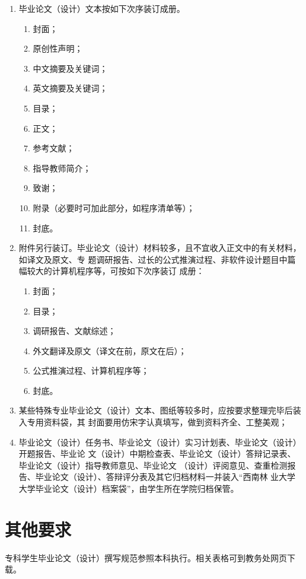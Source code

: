 \begin{enumerate}
\item 毕业论文（设计）文本按如下次序装订成册。
  \begin{enumerate}
  \item 封面；
  \item 原创性声明；
  \item 中文摘要及关键词；
  \item 英文摘要及关键词；
  \item 目录；
  \item 正文；
  \item 参考文献；
  \item 指导教师简介；
  \item 致谢；
  \item 附录（必要时可加此部分，如程序清单等）；
  \item 封底。
  \end{enumerate}
\item 附件另行装订。毕业论文（设计）材料较多，且不宜收入正文中的有关材料，如译文及原文、专
  题调研报告、过长的公式推演过程、非软件设计题目中篇幅较大的计算机程序等，可按如下次序装订
  成册：
  \begin{enumerate}
  \item 封面；
  \item 目录；
  \item 调研报告、文献综述；
  \item 外文翻译及原文（译文在前，原文在后）；
  \item 公式推演过程、计算机程序等；
  \item 封底。
  \end{enumerate}
\item 某些特殊专业毕业论文（设计）文本、图纸等较多时，应按要求整理完毕后装入专用资料袋，其
  封面要用仿宋字认真填写，做到资料齐全、工整美观；
\item 毕业论文（设计）任务书、毕业论文（设计）实习计划表、毕业论文（设计）开题报告、毕业论
  文（设计）中期检查表、毕业论文（设计）答辩记录表、毕业论文（设计）指导教师意见、毕业论文
  （设计）评阅意见、查重检测报告、毕业论文（设计）、答辩评分表及其它归档材料一并装入“西南林
  业大学大学毕业论文（设计）档案袋”，由学生所在学院归档保管。
\end{enumerate}

\section{其他要求}

专科学生毕业论文（设计）撰写规范参照本科执行。相关表格可到教务处网页下载。

